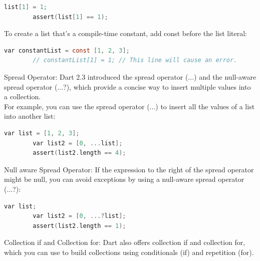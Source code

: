 \begin{itemize}
\begin{lstlisting}[language=C]
		list[1] = 1;
		assert(list[1] == 1);
	\end{lstlisting}
	To create a list that's a compile-time constant, add const before the list literal:
	\begin{lstlisting}[language=C]
		var constantList = const [1, 2, 3];
		// constantList[1] = 1; // This line will cause an error.
	\end{lstlisting}
	\subitem Spread Operator: Dart 2.3 introduced the spread operator (...) and the null-aware spread operator (...?), which provide a concise way to insert multiple values into a collection.
	\\For example, you can use the spread operator (...) to insert all the values of a list into another list:
	\begin{lstlisting}[language=C]
		var list = [1, 2, 3];
		var list2 = [0, ...list];
		assert(list2.length == 4);
	\end{lstlisting}
	\subitem Null aware Spread Operator: If the expression to the right of the spread operator might be null, you can avoid exceptions by using a null-aware spread operator (...?):
	
	\begin{lstlisting}[language=C]
		var list;
		var list2 = [0, ...?list];
		assert(list2.length == 1);
	\end{lstlisting}
	\subitem Collection if and Collection for:
	Dart also offers collection if and collection for, which you can use to build collections using conditionals (if) and repetition (for).
	

\end{itemize}
